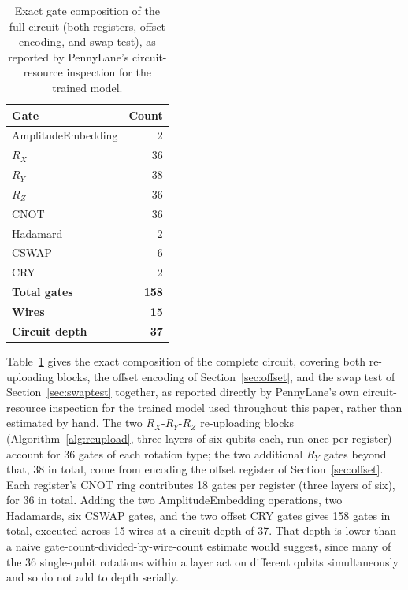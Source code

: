 \documentclass[conference]{IEEEtran}
\begin{document}
\begin{table}[t]
\centering
\caption{Exact gate composition of the full circuit (both registers, offset encoding, and swap test), as reported by PennyLane's circuit-resource inspection for the trained model.}
\label{tab:gatecount}
\begin{tabular}{lr}
\toprule
\textbf{Gate} & \textbf{Count}\\
\midrule
AmplitudeEmbedding & 2\\
$R_X$ & 36\\
$R_Y$ & 38\\
$R_Z$ & 36\\
CNOT & 36\\
Hadamard & 2\\
CSWAP & 6\\
CRY & 2\\
\midrule
\textbf{Total gates} & \textbf{158}\\
\textbf{Wires} & \textbf{15}\\
\textbf{Circuit depth} & \textbf{37}\\
\bottomrule
\end{tabular}
\end{table}

Table~\ref{tab:gatecount} gives the exact composition of the complete circuit, covering both re-uploading blocks, the offset encoding of Section~\ref{sec:offset}, and the swap test of Section~\ref{sec:swaptest} together, as reported directly by PennyLane's own circuit-resource inspection for the trained model used throughout this paper, rather than estimated by hand. The two $R_X$-$R_Y$-$R_Z$ re-uploading blocks (Algorithm~\ref{alg:reupload}, three layers of six qubits each, run once per register) account for 36 gates of each rotation type; the two additional $R_Y$ gates beyond that, 38 in total, come from encoding the offset register of Section~\ref{sec:offset}. Each register's CNOT ring contributes 18 gates per register (three layers of six), for 36 in total. Adding the two AmplitudeEmbedding operations, two Hadamards, six CSWAP gates, and the two offset CRY gates gives 158 gates in total, executed across 15 wires at a circuit depth of 37. That depth is lower than a naive gate-count-divided-by-wire-count estimate would suggest, since many of the 36 single-qubit rotations within a layer act on different qubits simultaneously and so do not add to depth serially.
\end{document}
